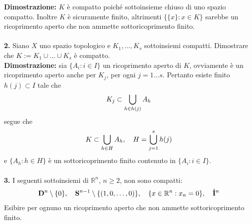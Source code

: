 \documentclass{article}
\begin{document}
\textbf{Dimostrazione:} $K$ è compatto poiché sottoinsieme chiuso di uno spazio compatto. Inoltre $K$ è sicuramente finito, altrimenti $\{ \{ x \} : x \in K \}$ sarebbe un ricoprimento aperto che non ammette sottoricoprimento finito. \\ \\
\textbf{2.} Siano $X$ uno spazio topologico e $K_1, \dots, K_s$ sottoinsiemi compatti. Dimostrare che $K := K_1 \cup \dots \cup K_s$ è compatto. \\

\textbf{Dimostrazione:} sia $\{ A_i : i \in I \}$ un ricoprimento aperto di $K$, ovviamente è un ricoprimento aperto anche per $K_j$, per ogni $j = 1 \dots s$. Pertanto esiste finito $h(j) \subset I$ tale che
\begin{gather}
    K_j \subset \bigcup_{h \in h(j)} A_h \notag
\end{gather}
segue che
\begin{gather}
    K \subset \bigcup_{h \in H} A_h, \quad H = \bigcup_{j = 1}^s h(j) \notag
\end{gather}
e $\{ A_h : h \in H \}$ è un sottoricoprimento finito contenuto in $\{ A_i : i \in I \}$. \\ \\
\textbf{3.} I seguenti sottoinsiemi di $\mathbb{R}^n$, $n \geq 2$, non sono compatti:
\begin{gather}
    \mathbf{D}^n \setminus \{ 0 \}, \quad \mathbf{S}^{n - 1} \setminus \{ (1, 0, \dots, 0) \}, \quad \{ x \in \mathbb{R}^n : x_n = 0 \}, \quad \mathring{\mathbf{I}}^n \notag
\end{gather}
Esibire per ognuno un ricoprimento aperto che non ammette sottoricoprimento finito. \\
\end{document}
